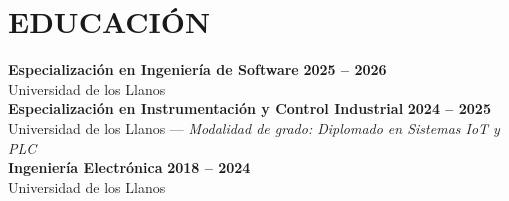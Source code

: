 \documentclass[letterpaper,10pt]{article}
\begin{document}
\section{EDUCACIÓN}
\textbf{Especialización en Ingeniería de Software} \hfill \textbf{2025 -- 2026} \\
Universidad de los Llanos \\
\textbf{Especialización en Instrumentación y Control Industrial} \hfill \textbf{2024 -- 2025} \\
Universidad de los Llanos --- \textit{Modalidad de grado: Diplomado en Sistemas IoT y PLC} \\
\textbf{Ingeniería Electrónica} \hfill \textbf{2018 -- 2024} \\
Universidad de los Llanos

\end{document}

